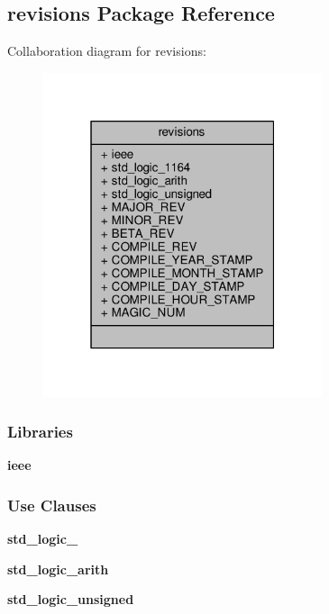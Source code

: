 \subsection{revisions Package Reference}
\label{classrevisions}


Collaboration diagram for revisions\+:\nopagebreak
\begin{figure}[H]
\begin{center}
\leavevmode
\includegraphics[width=232pt]{d7/d2d/classrevisions__coll__graph}
\end{center}
\end{figure}
\subsubsection*{Libraries}
 \begin{DoxyCompactItemize}
\item 
{\bf ieee} 
\end{DoxyCompactItemize}
\subsubsection*{Use Clauses}
 \begin{DoxyCompactItemize}
\item 
{\bf std\+\_\+logic\+\_}   
\item 
{\bf std\+\_\+logic\+\_\+arith}   
\item 
{\bf std\+\_\+logic\+\_\+unsigned}   
\end{DoxyCompactItemize}
